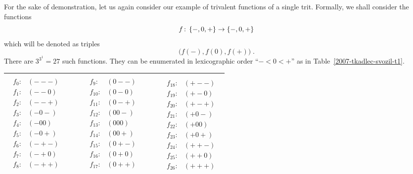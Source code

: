 \documentclass{article}
\begin{document}
For the sake of demonstration, let us again consider our example of trivalent functions of a single trit.
Formally, we shall consider the functions $$f \,{:}\linebreak[0]\,\;
\{-,0,+\} \to \{-,0,+\}$$ which will be denoted as triples
$$\bigl( f(-), f(0), f(+) \bigr)\; .$$
There are $3^{3^1} = 27$ such functions.
They can be enumerated in lexicographic order ``$-<0<+$'' as in Table~\ref{2007-tkadlec-svozil-t1}.
\begin{table*}
\label{2007-tkadlec-svozil-t1}
\renewcommand{\tabcolsep}{2pc} %
\renewcommand{\arraystretch}{1.2} %
\begin{tabular}{c}
\hline
$
\begin{array}{lllll}
\begin{array}{ll}
f_{0}: & (---)\\  f_{1}: & (--0)\\  f_{2}: & (--+)\\ f_{3}: & (-0-)\\  f_{4}: & (-00)\\  f_{5}: & (-0+)\\  f_{6}: & (-+-)\\  f_{7}: & (-+0)\\  f_{8}: & (-++)\\
\end{array}
&   \qquad  &
\begin{array}{ll}
f_{9}: & (0--)\\  f_{10}: & (0-0)\\  f_{11}: & (0-+)\\ f_{12}: & (00-)\\  f_{13}: & (000)\\  f_{14}: & (00+)\\ f_{15}: & (0+-)\\  f_{16}: & (0+0)\\  f_{17}: & (0++)\\
\end{array}
&   \qquad &
\begin{array}{ll}
f_{18}: & (+--)\\  f_{19}: & (+-0)\\  f_{20}: & (+-+)\\ f_{21}: & (+0-)\\  f_{22}: & (+00)\\  f_{23}: & (+0+)\\ f_{24}: & (++-)\\  f_{25}: & (++0)\\  f_{26}: & (+++)
\end{array}
\end{array}
$   \\
\hline
\end{tabular}
\caption{Enumeration of all trivalent functions of a single trit  in lexicographic order ``$-<0<+$.''}
\end{table*}
\end{document}
